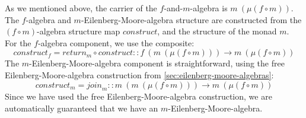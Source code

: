 \documentclass{jfp1}
\begin{document}
\begin{proof*}
  As we mentioned above, the carrier of the $f$-and-$m$-algebra is
  $m~(\mu(f \circ m))$. The $f$-algebra and
  $m$-Eilenberg-Moore-algebra structure are constructed from the $(f
  \circ m)$-algebra structure map $\mathit{construct}$, and the
  structure of the monad $m$.  For the $f$-algebra component, we use
  the composite:
  \begin{displaymath}
    \mathit{construct}_f = \mathit{return}_m \circ \mathit{construct} :: f~(m~(\mu(f \circ m))) \to m~(\mu(f \circ m))
  \end{displaymath}
  The $m$-Eilenberg-Moore-algebra component is straightforward, using
  the free Eilenberg-Moore-algebra construction from
  \autoref{sec:eilenberg-moore-algebras}:
  \begin{displaymath}
    \mathit{construct}_m = \mathit{join}_m :: m~(m~(\mu(f \circ m))) \to m~(\mu(f \circ m))
  \end{displaymath}
  Since we have used the free Eilenberg-Moore-algebra construction, we
  are automatically guaranteed that we have an
  $m$-Eilenberg-Moore-algebra.


\end{proof*}
\end{document}
